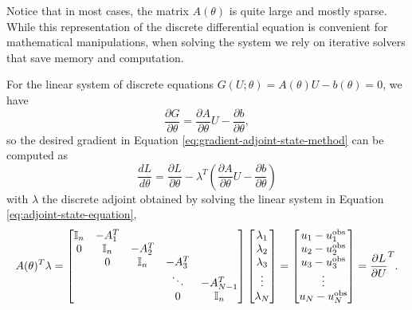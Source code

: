 Notice that in most cases, the matrix $A(\theta)$ is quite large and mostly sparse. 
While this representation of the discrete differential equation is  convenient for mathematical manipulations, when solving the system we rely on iterative solvers that save memory and computation. 

For the linear system of discrete equations $G(U; \theta)=A(\theta) U - b(\theta)=0$, we have 
\begin{equation}
    \frac{\partial G}{\partial \theta} 
    = 
    \frac{\partial A }{\partial \theta} U - \frac{\partial b}{\partial \theta},
\end{equation}
so the desired gradient in Equation \eqref{eq:gradient-adjoint-state-method} can be computed as 
\begin{equation}
    \frac{dL}{d\theta} 
    = 
    \frac{\partial L}{\partial \theta} 
    - 
    \lambda^T \left( \frac{\partial A }{\partial \theta} U - \frac{\partial b}{\partial \theta} \right)
    \label{eq:dhdtheta_linear}
\end{equation}
with $\lambda$ the discrete adjoint obtained by solving the linear system in Equation \eqref{eq:adjoint-state-equation},
\begin{equation}
    A(\theta)^T \lambda 
    =
    \begin{bmatrix}
        \operatorname{\mathbb{I}}_{n} & -A_1^T &   &  & \\
        0 & \operatorname{\mathbb{I}}_{n} & -A_2^T &  &  \\
          & 0 & \operatorname{\mathbb{I}}_{n} & -A_3^T &  \\
         &  &   & \ddots & -A_{N-1}^T  \\
         &  &  & 0 & \operatorname{\mathbb{I}}_{n}
    \end{bmatrix}
    \begin{bmatrix}
        \lambda_1 \\
        \lambda_2 \\
        \lambda_3 \\
        \vdots \\
        \lambda_N
    \end{bmatrix}
    = 
    \begin{bmatrix}
        u_1 - u_1^\text{obs} \\
        u_2 - u_2^\text{obs} \\
        u_3 - u_3^\text{obs} \\
        \vdots \\
        u_N - u_N^\text{obs}     
    \end{bmatrix}
    = 
    \frac{\partial L}{\partial U}^T.
    \label{eq:linea-adjoint-state-equation}
\end{equation}
